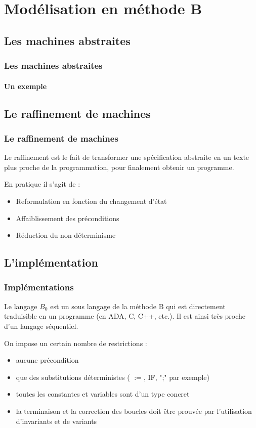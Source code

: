 \documentclass[11pt,a4paper,xcolor=table]{beamer} %
\begin{document}
\section{Modélisation en méthode B}
\subsection{Les machines abstraites}
\begin{frame}
\frametitle{Les machines abstraites}
\framesubtitle{Un exemple}

\end{frame}

\subsection{Le raffinement de machines}
\begin{frame}
\frametitle{Le raffinement de machines}
Le raffinement est le fait de transformer une spécification abstraite en un texte plus proche de la programmation, pour finalement obtenir un programme.

En pratique il s'agit de :
\begin{itemize}
\item Reformulation en fonction du changement d’état
\item Affaiblissement des préconditions
\item Réduction du non-déterminisme
\end{itemize}

\end{frame}



\subsection{L'implémentation}
\begin{frame}
\frametitle{Implémentations}
Le langage $B_0$ est un sous langage de la méthode B qui est directement traduisible en un programme (en ADA, C, C++, etc.).  Il est ainsi très proche d'un langage séquentiel.

\pause

On impose un certain nombre de restrictions :
\begin{itemize}
\item aucune précondition
\item que des substitutions déterministes ( $:=$, \textsc{IF}, ";" par exemple)
\item toutes les constantes et variables sont d'un type concret
\item la terminaison et la correction des boucles doit être prouvée par l'utilisation d'invariants et de variants
\end{itemize}

\end{frame}
\end{document}
